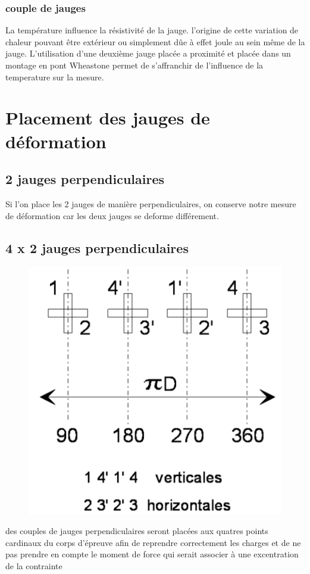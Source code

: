 \documentclass[11pt,a4paper]{report}
\begin{document}
\subsubsection*{couple de jauges}
La température influence la résistivité de la jauge. l'origine de cette variation de chaleur pouvant être extérieur ou simplement dûe à effet joule au sein même de la jauge. L'utilisation d'une deuxième jauge placée a proximité et placée dans un montage en pont Wheastone permet de s'affranchir de l'influence de la temperature sur la mesure.
\section{Placement des jauges de déformation}
\subsection{2 jauges perpendiculaires}
Si l'on place les 2 jauges de manière perpendiculaires, on conserve notre mesure de déformation car les deux jauges se deforme différement.
\subsection{4 x 2 jauges perpendiculaires}
\begin{figure}
\includegraphics[scale=0.2]{jauge.png} 
\end{figure}
des couples de jauges perpendiculaires seront placées aux quatres points cardinaux du corps d'épreuve afin de reprendre correctement les charges et de ne pas prendre en compte le moment de force qui serait associer à une excentration de la contrainte
\end{document}
